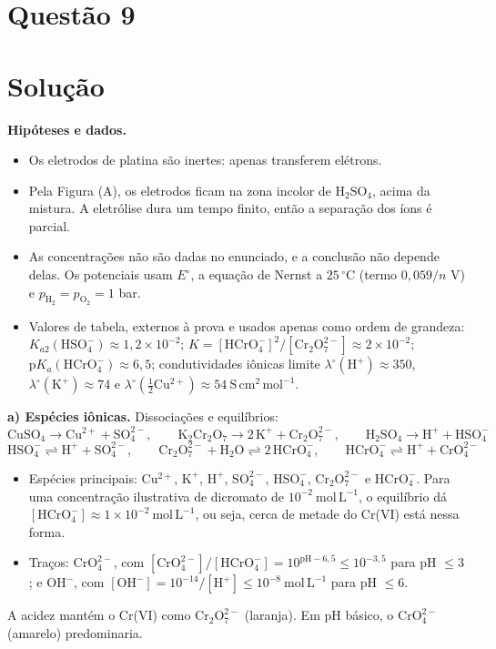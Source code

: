 \documentclass{article}%
\begin{document}
\section*{Questão 9}

\section*{Solução}

\textbf{Hipóteses e dados.}
\begin{itemize}
\item Os eletrodos de platina são inertes: apenas transferem elétrons.
\item Pela Figura (A), os eletrodos ficam na zona incolor de $\mathrm{H_2SO_4}$, acima da mistura. A eletrólise dura um tempo finito, então a separação dos íons é parcial.
\item As concentrações não são dadas no enunciado, e a conclusão não depende delas. Os potenciais usam $E^\circ$, a equação de Nernst a $25\,^\circ\mathrm{C}$ (termo $0{,}059/n$ V) e $p_{\mathrm{H_2}}=p_{\mathrm{O_2}}=1$ bar.
\item Valores de tabela, externos à prova e usados apenas como ordem de grandeza: $K_{a2}(\mathrm{HSO_4^-})\approx 1{,}2\times10^{-2}$; $K=[\mathrm{HCrO_4^-}]^2/[\mathrm{Cr_2O_7^{2-}}]\approx 2\times10^{-2}$; $\mathrm{p}K_a(\mathrm{HCrO_4^-})\approx 6{,}5$; condutividades iônicas limite $\lambda^\circ(\mathrm{H^+})\approx 350$, $\lambda^\circ(\mathrm{K^+})\approx 74$ e $\lambda^\circ(\tfrac12\mathrm{Cu^{2+}})\approx 54\ \mathrm{S\,cm^2\,mol^{-1}}$.
\end{itemize}

\textbf{a) Espécies iônicas.} Dissociações e equilíbrios:
\[
\mathrm{CuSO_4 \rightarrow Cu^{2+} + SO_4^{2-}},\qquad
\mathrm{K_2Cr_2O_7 \rightarrow 2\,K^+ + Cr_2O_7^{2-}},\qquad
\mathrm{H_2SO_4 \rightarrow H^+ + HSO_4^-}
\]
\[
\mathrm{HSO_4^- \rightleftharpoons H^+ + SO_4^{2-}},\qquad
\mathrm{Cr_2O_7^{2-} + H_2O \rightleftharpoons 2\,HCrO_4^-},\qquad
\mathrm{HCrO_4^- \rightleftharpoons H^+ + CrO_4^{2-}}
\]
\begin{itemize}
\item Espécies principais: $\mathrm{Cu^{2+}}$, $\mathrm{K^+}$, $\mathrm{H^+}$, $\mathrm{SO_4^{2-}}$, $\mathrm{HSO_4^-}$, $\mathrm{Cr_2O_7^{2-}}$ e $\mathrm{HCrO_4^-}$. Para uma concentração ilustrativa de dicromato de $10^{-2}\ \mathrm{mol\,L^{-1}}$, o equilíbrio dá $[\mathrm{HCrO_4^-}]\approx 1\times10^{-2}\ \mathrm{mol\,L^{-1}}$, ou seja, cerca de metade do Cr(VI) está nessa forma.
\item Traços: $\mathrm{CrO_4^{2-}}$, com $[\mathrm{CrO_4^{2-}}]/[\mathrm{HCrO_4^-}]=10^{\mathrm{pH}-6{,}5}\le 10^{-3{,}5}$ para pH $\le 3$; e $\mathrm{OH^-}$, com $[\mathrm{OH^-}]=10^{-14}/[\mathrm{H^+}]\le 10^{-8}\ \mathrm{mol\,L^{-1}}$ para pH $\le 6$.
\end{itemize}
A acidez mantém o Cr(VI) como $\mathrm{Cr_2O_7^{2-}}$ (laranja). Em pH básico, o $\mathrm{CrO_4^{2-}}$ (amarelo) predominaria.
\end{document}
